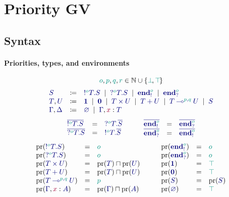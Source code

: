 \documentclass[main.tex]{subfiles}
\begin{document}
\section{Priority GV}

\subsection{Syntax}

\paragraph*{Priorities, types, and environments}
\[
  \cs{o}, \cs{p}, \cs{q}, \cs{r} \in \mathbb{N}\cup\{\cs{\pbot},\cs{\ptop}\}
\]
\[
\begin{array}{lcl}
  \ty{S}
  & \coloneqq & \ty{\tysend[\cs{o}]{T}{S}}
    \sep        \ty{\tyrecv[\cs{o}]{T}{S}}
    \sep        \ty{\tyends[\cs{o}]}
    \sep        \ty{\tyendr[\cs{o}]}
  \\
  \ty{T}, \ty{U}
  & \coloneqq & \ty{\tyunit}
    \sep        \ty{\tyvoid}
    \sep        \ty{\typrod{T}{U}}
    \sep        \ty{\tysum{T}{U}}
    \sep        \ty{\tylolli[\cs{p},\cs{q}]{T}{U}}
    \sep        \ty{S}
  \\
  \ty{\Gamma}, \ty{\Delta}
  & \coloneqq & \ty{\emptyenv}
    \sep        \ty{\Gamma}, \tmty{x}{T}
\end{array}
\]
\[
\begin{array}{lcl}
  \ty{\co{\tysend[\cs{o}]{T}{S}}} & = & \ty{\tyrecv[\cs{o}]{T}{\co{S}}} \\
  \ty{\co{\tyrecv[\cs{o}]{T}{S}}} & = & \ty{\tysend[\cs{o}]{T}{\co{S}}}
\end{array}
\qquad
\begin{array}{lcl}
  \ty{\co{\tyends[\cs{o}]}} & = & \ty{\co{\tyendr[\cs{o}]}} \\
  \ty{\co{\tyendr[\cs{o}]}} & = & \ty{\co{\tyends[\cs{o}]}}
\end{array}
\]
\[
\begin{array}{lcl}
  \pr(\ty{\tysend[\cs{o}]{T}{S}}) & = & \cs{o} \\
  \pr(\ty{\tyrecv[\cs{o}]{T}{S}}) & = & \cs{o} \\
  \pr(\ty{\typrod{T}{U}}) & = & \pr({\ty{T}})\sqcap\pr({\ty{U}}) \\
  \pr(\ty{\tysum{T}{U}})  & = & \pr({\ty{T}})\sqcap\pr({\ty{U}}) \\
  \pr(\ty{\tylolli[\cs{p},\cs{q}]{T}{U}}) & = & \cs{p} \\
  \pr(\ty{\Gamma}, \tmty{x}{A}) & = & \pr(\ty{\Gamma})\sqcap\pr(\ty{A})
\end{array}
\qquad
\begin{array}{lcl}
  \pr(\ty{\tyends[\cs{o}]}) & = & \cs{o} \\
  \pr(\ty{\tyendr[\cs{o}]}) & = & \cs{o} \\
  \pr(\ty{\tyunit})         & = & \ptop \\
  \pr(\ty{\tyvoid})         & = & \ptop \\
  \pr(\ty{S})               & = & \pr(\ty{S}) \\
  \pr(\ty{\emptyenv})       & = & \ptop
\end{array}
\]
\end{document}
